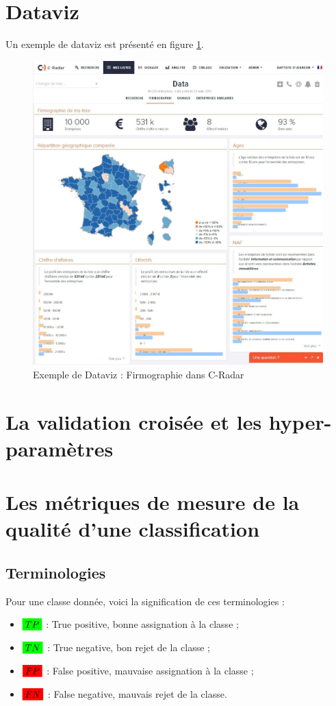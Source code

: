 \section{Dataviz}
\label{annexe:firmo}
    Un exemple de dataviz est présenté en figure \ref{fig:firmo}.
    \begin{figure}[h!]
        \centering
        \includegraphics[width=\textwidth]{images/firmo.jpg}
        \caption{Exemple de Dataviz : Firmographie dans C-Radar}
        \label{fig:firmo}
    \end{figure}

\section{La validation croisée et les hyper-paramètres}
\label{annexe:cv}

\section{Les métriques de mesure de la qualité d'une classification}
    \subsection{Terminologies}
        Pour une classe donnée, voici la signification de ces terminologies :
        \begin{itemize}
            \item $\highlight[green]{TP}$ : True positive, bonne assignation à la classe ;
            \item $\highlight[green]{TN}$ : True negative, bon rejet de la classe ;
            \item $\highlight[red]{FP}$ : False positive, mauvaise assignation à la classe ;
            \item $\highlight[red]{FN}$ : False negative, mauvais rejet de la classe.
        \end{itemize}

